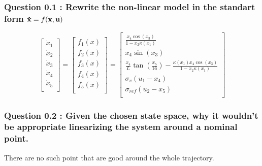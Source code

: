 \subsubsection*{Question 0.1 : Rewrite the non-linear model in the standart form $\bold{\dot{x}} = f(\bold{x}, \bold{u})$}
\begin{equation}
    \left[ {\begin{array}{c}
        \dot{x}_1\\
        \dot{x}_2\\
        \dot{x}_3\\
        \dot{x}_4\\
        \dot{x}_5\\
    \end{array} } \right]
    =
    \left[ {\begin{array}{c}
        f_1(x)\\
        f_2(x)\\
        f_3(x)\\
        f_4(x)\\
        f_5(x)\\
    \end{array} } \right] 
    =
    \left[ {\begin{array}{c}
        \frac{x_4 \cos(x_3)}{1 - x_2\kappa(x_1)}\\
        x_4 \sin(x_3)\\
        \frac{x_4}{L}\tan(\frac{x_5}{16}) - \frac{\kappa(x_1) x_4 \cos(x_3)}{1 - x_2 \kappa(x_1)}\\
        \sigma_v (u_1 - x_4)\\
        \sigma_{ref} (u_2 - x_5)\\
    \end{array} } \right]
\end{equation}



\subsubsection*{Question 0.2 : Given the chosen state space, why it wouldn’t be appropriate linearizing the system around a nominal point.}
There are no such point that are good around the whole trajectory.



